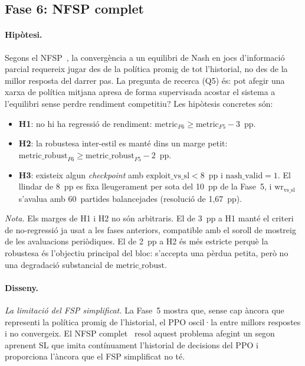 \subsection{Fase 6: \ac{NFSP} complet}
\label{sec:fase6}

\paragraph{Hipòtesi.} Segons el \ac{NFSP}~\cite{heinrich2016nfsp}, la convergència a un
equilibri de Nash en jocs d'informació parcial requereix jugar des de la
política promig de tot l'historial, no des de la millor resposta del darrer pas. La
pregunta de recerca (Q5) és: pot afegir una xarxa de política mitjana apresa de forma
supervisada acostar el sistema a l'equilibri sense perdre rendiment competitiu? Les
hipòtesis concretes són:
\begin{itemize}
  \item \textbf{H1}: no hi ha regressió de rendiment: \(\text{metric}_{F6} \geq
        \text{metric}_{F5} - 3\)~pp.
  \item \textbf{H2}: la robustesa inter-estil es manté dins un marge petit:
        \(\text{metric\_robust}_{F6} \geq \text{metric\_robust}_{F5} - 2\)~pp.
  \item \textbf{H3}: existeix algun \emph{checkpoint} amb
        \(\text{exploit\_vs\_sl} < 8\)~pp i \(\text{nash\_valid}=1\). El llindar de 8~pp
        es fixa lleugerament per sota del 10~pp de la Fase~5, i
        \(\text{wr}_{\text{vs\_sl}}\) s'avalua amb 60~partides balancejades
        (resolució de 1{,}67~pp).
\end{itemize}

\emph{Nota.} Els marges de H1 i H2 no són arbitraris. El de 3~pp a H1 manté el criteri
de no-regressió ja usat a les fases anteriors, compatible amb el soroll de mostreig de
les avaluacions periòdiques. El de 2~pp a H2 és més estricte perquè la robustesa és
l'objectiu principal del bloc: s'accepta una pèrdua petita, però no una degradació
substancial de \(\text{metric\_robust}\).

\paragraph{Disseny.}

\emph{La limitació del \ac{FSP} simplificat.} La Fase~5 mostra que, sense
cap àncora que representi la política promig de l'historial, el PPO oscil·la entre
millors respostes i no convergeix. El \ac{NFSP} complet~\cite{heinrich2016nfsp} resol
aquest problema afegint un segon aprenent \ac{SL} que imita contínuament l'historial
de decisions del PPO i proporciona l'àncora que el \ac{FSP} simplificat no
té.

